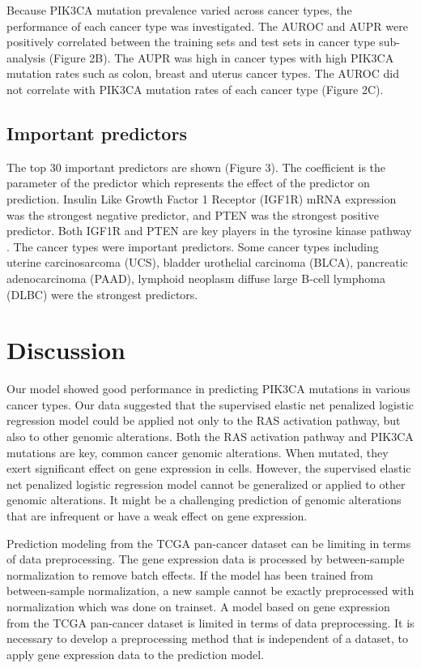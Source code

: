 \documentclass[10pt,letterpaper]{article}
\begin{document}
Because PIK3CA mutation prevalence varied across cancer types, the
performance of each cancer type was investigated. The AUROC and AUPR
were positively correlated between the training sets and test sets in
cancer type sub-analysis (Figure 2B). The AUPR was high in cancer types
with high PIK3CA mutation rates such as colon, breast and uterus cancer
types. The AUROC did not correlate with PIK3CA mutation rates of each
cancer type (Figure 2C).

\hypertarget{important-predictors}{%
\subsection{Important predictors}\label{important-predictors}}

The top 30 important predictors are shown (Figure 3). The coefficient is
the parameter of the predictor which represents the effect of the
predictor on prediction. Insulin Like Growth Factor 1 Receptor (IGF1R)
mRNA expression was the strongest negative predictor, and PTEN was the
strongest positive predictor. Both IGF1R and PTEN are key players in the
tyrosine kinase pathway . The cancer types were important predictors.
Some cancer types including uterine carcinosarcoma (UCS), bladder
urothelial carcinoma (BLCA), pancreatic adenocarcinoma (PAAD), lymphoid
neoplasm diffuse large B-cell lymphoma (DLBC) were the strongest
predictors.

\hypertarget{discussion}{%
\section{Discussion}\label{discussion}}

Our model showed good performance in predicting PIK3CA mutations in
various cancer types. Our data suggested that the supervised elastic net
penalized logistic regression model could be applied not only to the RAS
activation pathway, but also to other genomic alterations. Both the RAS
activation pathway and PIK3CA mutations are key, common cancer genomic
alterations. When mutated, they exert significant effect on gene
expression in cells. However, the supervised elastic net penalized
logistic regression model cannot be generalized or applied to other
genomic alterations. It might be a challenging prediction of genomic
alterations that are infrequent or have a weak effect on gene
expression.

Prediction modeling from the TCGA pan-cancer dataset can be limiting in
terms of data preprocessing. The gene expression data is processed by
between-sample normalization to remove batch effects. If the model has
been trained from between-sample normalization, a new sample cannot be
exactly preprocessed with normalization which was done on trainset. A
model based on gene expression from the TCGA pan-cancer dataset is
limited in terms of data preprocessing. It is necessary to develop a
preprocessing method that is independent of a dataset, to apply gene
expression data to the prediction model.
\end{document}
